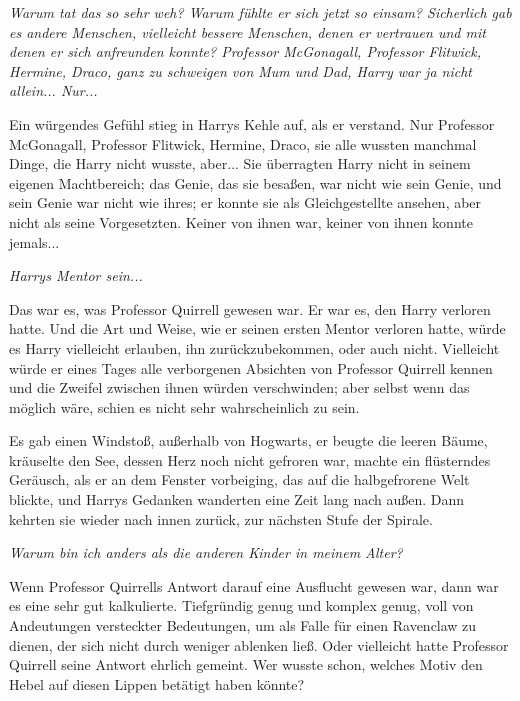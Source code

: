 {\emph{Warum tat das so sehr weh? Warum fühlte er sich jetzt so einsam? Sicherlich gab es andere Menschen, vielleicht bessere Menschen, denen er vertrauen und mit denen er sich anfreunden konnte? Professor McGonagall, Professor Flitwick, Hermine, Draco, ganz zu schweigen von Mum und Dad, Harry war ja nicht allein... Nur...}

Ein würgendes Gefühl stieg in Harrys Kehle auf, als er verstand. Nur Professor McGonagall, Professor Flitwick, Hermine, Draco, sie alle wussten manchmal Dinge, die Harry nicht wusste, aber... Sie überragten Harry nicht in seinem eigenen Machtbereich; das Genie, das sie besaßen, war nicht wie sein Genie, und sein Genie war nicht wie ihres; er konnte sie als Gleichgestellte ansehen, aber nicht als seine Vorgesetzten. Keiner von ihnen war, keiner von ihnen konnte jemals...

\emph{Harrys Mentor sein...}

Das war es, was Professor Quirrell gewesen war. Er war es, den Harry verloren hatte. Und die Art und Weise, wie er seinen ersten Mentor verloren hatte, würde es Harry vielleicht erlauben, ihn zurückzubekommen, oder auch nicht. Vielleicht würde er eines Tages alle verborgenen Absichten von Professor Quirrell kennen und die Zweifel zwischen ihnen würden verschwinden; aber selbst wenn das möglich wäre, schien es nicht sehr wahrscheinlich zu sein.

Es gab einen Windstoß, außerhalb von Hogwarts, er beugte die leeren Bäume, kräuselte den See, dessen Herz noch nicht gefroren war, machte ein flüsterndes Geräusch, als er an dem Fenster vorbeiging, das auf die halbgefrorene Welt blickte, und Harrys Gedanken wanderten eine Zeit lang nach außen. Dann kehrten sie wieder nach innen zurück, zur nächsten Stufe der Spirale.

\emph{Warum bin ich anders als die anderen Kinder in meinem Alter?}

Wenn Professor Quirrells Antwort darauf eine Ausflucht gewesen war, dann war es eine sehr gut kalkulierte. Tiefgründig genug und komplex genug, voll von Andeutungen versteckter Bedeutungen, um als Falle für einen Ravenclaw zu dienen, der sich nicht durch weniger ablenken ließ. Oder vielleicht hatte Professor Quirrell seine Antwort ehrlich gemeint. Wer wusste schon, welches Motiv den Hebel auf diesen Lippen betätigt haben könnte?

}
